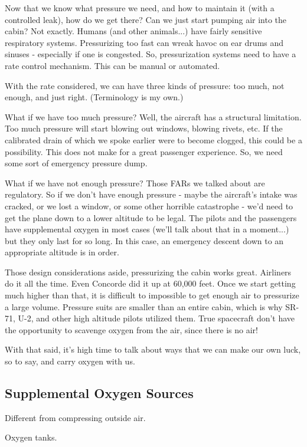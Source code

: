 Now that we know what pressure we need, and how to maintain it (with a controlled leak), how do we get there? Can we just start pumping air into the cabin? Not exactly. Humans (and other animals...) have fairly sensitive respiratory systems. Pressurizing too fast can wreak havoc on ear drums and sinuses - especially if one is congested. So, pressurization systems need to have a rate control mechanism. This can be manual or automated.

With the rate considered, we can have three kinds of pressure: too much, not enough, and just right. (Terminology is my own.)

What if we have too much pressure? Well, the aircraft has a structural limitation. Too much pressure will start blowing out windows, blowing rivets, etc. If the calibrated drain of which we spoke earlier were to become clogged, this could be a possibility. This does not make for a great passenger experience. So, we need some sort of emergency pressure dump.

What if we have not enough pressure? Those FARs we talked about are regulatory. So if we don't have enough pressure - maybe the aircraft's intake was cracked, or we lost a window, or some other horrible catastrophe - we'd need to get the plane down to a lower altitude to be legal. The pilots and the passengers have supplemental oxygen in most cases (we'll talk about that in a moment...) but they only last for so long. In this case, an emergency descent down to an appropriate altitude is in order.

Those design considerations aside, pressurizing the cabin works great. Airliners do it all the time. Even Concorde did it up at 60,000 feet. Once we start getting much higher than that, it is difficult to impossible to get enough air to pressurize a large volume. Pressure suits are smaller than an entire cabin, which is why SR-71, U-2, and other high altitude pilots utilized them. True spacecraft don't have the opportunity to scavenge oxygen from the air, since there is no air!

With that said, it's high time to talk about ways that we can make our own luck, so to say, and carry oxygen with us.

\subsection{Supplemental Oxygen Sources}

Different from compressing outside air.

Oxygen tanks.

